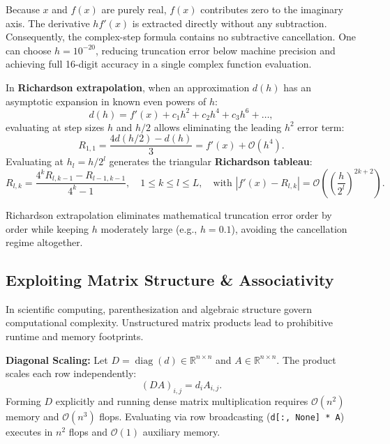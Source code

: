 Because $x$ and $f(x)$ are purely real, $f(x)$ contributes zero to the imaginary axis. The derivative $h f'(x)$ is extracted directly without any subtraction. Consequently, the complex-step formula contains no subtractive cancellation. One can choose $h = 10^{-20}$, reducing truncation error below machine precision and achieving full 16-digit accuracy in a single complex function evaluation.

\begin{definition}
    In \textbf{Richardson extrapolation}, when an approximation $d(h)$ has an asymptotic expansion in known even powers of $h$:
    \begin{equation}
        d(h) = f'(x) + c_1 h^2 + c_2 h^4 + c_3 h^6 + \dots,
    \end{equation}
    evaluating at step sizes $h$ and $h/2$ allows eliminating the leading $h^2$ error term:
    \begin{equation}
        R_{1,1} = \frac{4 d(h/2) - d(h)}{3} = f'(x) + \mathcal{O}(h^4).
    \end{equation}
    Evaluating at $h_l = h/2^l$ generates the triangular \textbf{Richardson tableau}:
    \begin{equation}
        R_{l,k} = \frac{4^k R_{l,k-1} - R_{l-1,k-1}}{4^k - 1}, \quad 1 \le k \le l \le L, \quad \text{with } |f'(x) - R_{l,k}| = \mathcal{O}\left( \left(\frac{h}{2^l}\right)^{2k+2} \right).
    \end{equation}
\end{definition}

Richardson extrapolation eliminates mathematical truncation error order by order while keeping $h$ moderately large (e.g., $h = 0.1$), avoiding the cancellation regime altogether.

\subsection{Exploiting Matrix Structure \& Associativity}

In scientific computing, parenthesization and algebraic structure govern computational complexity. Unstructured matrix products lead to prohibitive runtime and memory footprints.

\textbf{Diagonal Scaling:} Let $D = \operatorname{diag}(d) \in \mathbb{R}^{n \times n}$ and $A \in \mathbb{R}^{n \times n}$. The product scales each row independently:
\begin{equation}
    (DA)_{i,j} = d_i A_{i,j}.
\end{equation}
Forming $D$ explicitly and running dense matrix multiplication requires $\mathcal{O}(n^2)$ memory and $\mathcal{O}(n^3)$ flops. Evaluating via row broadcasting (\texttt{d[:, None] * A}) executes in $n^2$ flops and $\mathcal{O}(1)$ auxiliary memory.


